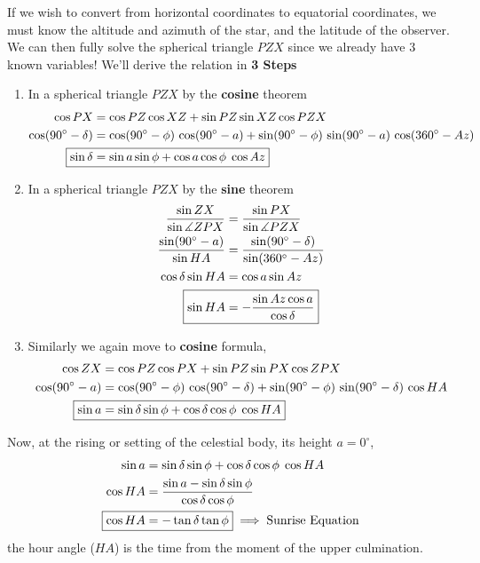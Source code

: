 \documentclass[a4paper,12pt]{extarticle}
\begin{document}
If we wish to convert from horizontal
coordinates to equatorial coordinates, we must know the altitude and azimuth of the star, and the latitude of the observer. We can then fully solve the spherical triangle $PZX$ since we already have 3 known variables! We'll derive the relation in \textbf{3 Steps}
\begin{enumerate}
	\item In a spherical triangle $PZX$ by the \textbf{cosine} theorem
	\begin{align*}
		\cos PX &= \cos PZ \cos XZ + \sin PZ \sin XZ \cos PZX\\
		\cos (90^\circ-\delta)&=\cos (90^\circ-\phi)\,\cos (90^\circ-a)+ \sin (90^\circ-\phi)\,\sin (90^\circ-a)\, \cos (360^\circ-Az)\\
		\Aboxed{\sin\delta &= \sin a \sin \phi + \cos a \cos \phi \; \cos Az}
	\end{align*}
	\item  In a spherical triangle $PZX$ by the \textbf{sine} theorem
	\begin{align*}
		\frac{\sin ZX}{\sin \measuredangle ZPX}&=\frac{\sin PX}{\sin \measuredangle PZX}\\
		\frac{\sin(90^\circ-a)}{\sin HA}&=\frac{\sin(90^\circ-\delta)}{\sin(360^\circ-Az)}\\
		\cos \delta \sin HA &=\cos a \sin Az\\
		\Aboxed{\sin HA &= -\frac{\sin Az \cos a}{\cos\delta }}
	\end{align*}
	\item Similarly we again move to \textbf{cosine} formula, 
	\begin{align*}
		\cos ZX &= \cos PZ \cos PX + \sin PZ \sin PX \cos ZPX\\
		\cos (90^\circ-a)&=\cos (90^\circ-\phi)\,\cos (90^\circ-\delta)+ \sin (90^\circ-\phi)\,\sin (90^\circ-\delta)\, \cos HA\\
		\Aboxed{\sin a &= \sin \delta \sin \phi + \cos \delta \cos \phi \; \cos HA}
	\end{align*}	
\end{enumerate}
Now, at the rising or setting of the celestial body,
its height $a=0^\circ$,
\begin{align*}
	\sin a &= \sin \delta \sin \phi + \cos \delta \cos \phi \; \cos HA\\
	\cos HA&=\frac{\sin a -\sin \delta \sin \phi}{\cos \delta \cos \phi}\\
	\Aboxed{\cos HA&= - \tan \delta \tan \phi} \implies \text{Sunrise Equation}
\end{align*}
the hour angle ($HA$) is the time from the moment of the upper culmination.\\
\end{document}
